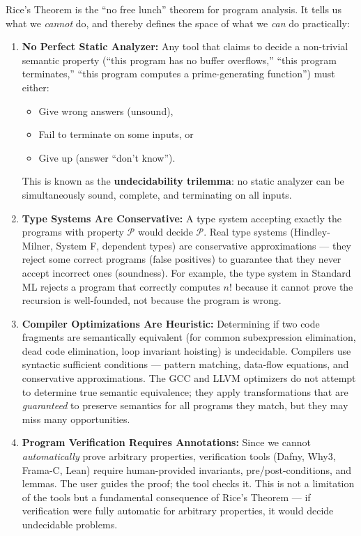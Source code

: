 Rice's Theorem is the ``no free lunch'' theorem for program analysis. It tells us what we \emph{cannot} do, and thereby defines the space of what we \emph{can} do practically:

\begin{enumerate}
\item \textbf{No Perfect Static Analyzer:} Any tool that claims to decide a non-trivial semantic property (``this program has no buffer overflows,'' ``this program terminates,'' ``this program computes a prime-generating function'') must either:
\begin{itemize}
\item Give wrong answers (unsound),
\item Fail to terminate on some inputs, or
\item Give up (answer ``don't know'').
\end{itemize}
This is known as the \textbf{undecidability trilemma}: no static analyzer can be simultaneously sound, complete, and terminating on all inputs.

\item \textbf{Type Systems Are Conservative:} A type system accepting exactly the programs with property $\mathcal{P}$ would decide $\mathcal{P}$. Real type systems (Hindley-Milner, System F, dependent types) are conservative approximations --- they reject some correct programs (false positives) to guarantee that they never accept incorrect ones (soundness). For example, the type system in Standard ML rejects a program that correctly computes $n!$ because it cannot prove the recursion is well-founded, not because the program is wrong.

\item \textbf{Compiler Optimizations Are Heuristic:} Determining if two code fragments are semantically equivalent (for common subexpression elimination, dead code elimination, loop invariant hoisting) is undecidable. Compilers use syntactic sufficient conditions --- pattern matching, data-flow equations, and conservative approximations. The GCC and LLVM optimizers do not attempt to determine true semantic equivalence; they apply transformations that are \emph{guaranteed} to preserve semantics for all programs they match, but they may miss many opportunities.

\item \textbf{Program Verification Requires Annotations:} Since we cannot \emph{automatically} prove arbitrary properties, verification tools (Dafny, Why3, Frama-C, Lean) require human-provided invariants, pre/post-conditions, and lemmas. The user guides the proof; the tool checks it. This is not a limitation of the tools but a fundamental consequence of Rice's Theorem --- if verification were fully automatic for arbitrary properties, it would decide undecidable problems.


\end{enumerate}
